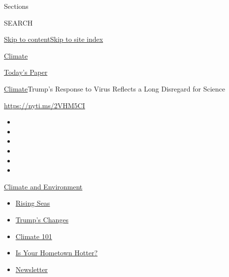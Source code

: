 Sections

SEARCH

\protect\hyperlink{site-content}{Skip to
content}\protect\hyperlink{site-index}{Skip to site index}

\href{https://www.nytimes.com/section/climate}{Climate}

\href{https://myaccount.nytimes.com/auth/login?response_type=cookie\&client_id=vi}{}

\href{https://www.nytimes.com/section/todayspaper}{Today's Paper}

\href{/section/climate}{Climate}\textbar{}Trump's Response to Virus
Reflects a Long Disregard for Science

\url{https://nyti.ms/2VHM5CI}

\begin{itemize}
\item
\item
\item
\item
\item
\item
\end{itemize}

\href{https://www.nytimes.com/section/climate?action=click\&pgtype=Article\&state=default\&region=TOP_BANNER\&context=storylines_menu}{Climate
and Environment}

\begin{itemize}
\tightlist
\item
  \href{https://www.nytimes.com/2020/07/30/climate/sea-level-inland-floods.html?action=click\&pgtype=Article\&state=default\&region=TOP_BANNER\&context=storylines_menu}{Rising
  Seas}
\item
  \href{https://www.nytimes.com/interactive/2020/climate/trump-environment-rollbacks.html?action=click\&pgtype=Article\&state=default\&region=TOP_BANNER\&context=storylines_menu}{Trump's
  Changes}
\item
  \href{https://www.nytimes.com/interactive/2020/04/19/climate/climate-crash-course-1.html?action=click\&pgtype=Article\&state=default\&region=TOP_BANNER\&context=storylines_menu}{Climate
  101}
\item
  \href{https://www.nytimes.com/interactive/2018/08/30/climate/how-much-hotter-is-your-hometown.html?action=click\&pgtype=Article\&state=default\&region=TOP_BANNER\&context=storylines_menu}{Is
  Your Hometown Hotter?}
\item
  \href{https://www.nytimes.com/newsletters/climate-change?action=click\&pgtype=Article\&state=default\&region=TOP_BANNER\&context=storylines_menu}{Newsletter}
\end{itemize}

